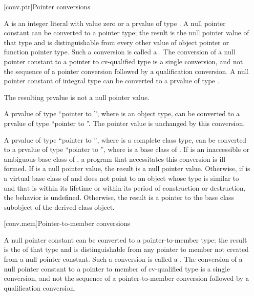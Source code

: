 [conv.ptr]{Pointer conversions}

\pnum
{}%
%
%
%
A  is an integer literal with
value zero
or a prvalue of type . A null pointer constant can be
converted to a pointer type; the
result is the null pointer value of that type and is
distinguishable from every other value of
object pointer or function pointer
type.
Such a conversion is called a .
The conversion of a null pointer constant to a pointer to
cv-qualified type is a single conversion, and not the sequence of a
pointer conversion followed by a qualification
conversion. A null pointer constant of integral type
can be converted to a prvalue of type .
\begin{note}
The resulting prvalue is not a null pointer value.
\end{note}

\pnum
A prvalue of type ``pointer to \cv{} '', where 
is an object type, can be converted to a prvalue of type ``pointer to
\cv{} ''.
The pointer value is unchanged by this conversion.

\pnum
A prvalue  of type ``pointer to \cv{} '', where 
is a complete class type, can be converted to a prvalue of type ``pointer to
\cv{} '', where  is a base class
of . If  is an
inaccessible or
ambiguous base class of , a program
that necessitates this conversion is ill-formed.
If  is a null pointer value,
the result is a null pointer value.
Otherwise,
if  is a virtual base class of  and
 does not point to an object
whose type is similar to  and
that is
within its lifetime or
within its period of construction or destruction,
the behavior is undefined.
Otherwise,
the result is a pointer to the base class subobject of
the derived class object.

[conv.mem]{Pointer-to-member conversions}

\pnum
{}%
%
%
A null pointer constant can be converted to a
pointer-to-member
type; the result is the 
of that type and is distinguishable from any pointer to member not
created from a null pointer constant.
Such a conversion is called a .
The conversion of a null pointer
constant to a pointer to member of cv-qualified type is a single
conversion, and not the sequence of a pointer-to-member conversion
followed by a qualification conversion.

